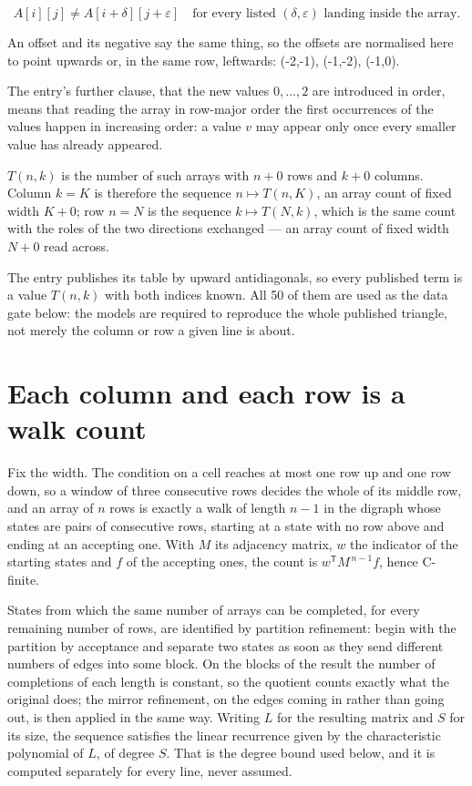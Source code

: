 \documentclass[11pt]{article}
\theoremstyle{definition}
\begin{document}
\[A[i][j] \ne A[i{+}\delta][j{+}\varepsilon]\quad\text{for every listed }(\delta,\varepsilon)\text{ landing inside the array.}\]

An offset and its negative say the same thing, so the offsets are normalised here to point upwards or, in the same row, leftwards: (-2,-1), (-1,-2), (-1,0).

The entry's further clause, that the new values $0,\dots,2$ are introduced in order, means that reading the array in row-major order the first occurrences of the values happen in increasing order: a value $v$ may appear only once every smaller value has already appeared.

$T(n,k)$ is the number of such arrays with $n + 0$ rows and $k + 0$ columns. Column $k = K$ is therefore the sequence $n \mapsto T(n,K)$, an array count of fixed width $K + 0$; row $n = N$ is the sequence $k \mapsto T(N,k)$, which is the same count with the roles of the two directions exchanged --- an array count of fixed width $N + 0$ read across.

The entry publishes its table by upward antidiagonals, so every published term is a value $T(n,k)$ with both indices known. All 50 of them are used as the data gate below: the models are required to reproduce the whole published triangle, not merely the column or row a given line is about.

\section{Each column and each row is a walk count}

Fix the width. The condition on a cell reaches at most one row up and one row down, so a window of three consecutive rows decides the whole of its middle row, and an array of $n$ rows is exactly a walk of length $n-1$ in the digraph whose states are pairs of consecutive rows, starting at a state with no row above and ending at an accepting one. With $M$ its adjacency matrix, $w$ the indicator of the starting states and $f$ of the accepting ones, the count is $w^{\mathsf T}M^{\,n-1}f$, hence C-finite.

States from which the same number of arrays can be completed, for every remaining number of rows, are identified by partition refinement: begin with the partition by acceptance and separate two states as soon as they send different numbers of edges into some block. On the blocks of the result the number of completions of each length is constant, so the quotient counts exactly what the original does; the mirror refinement, on the edges coming in rather than going out, is then applied in the same way. Writing $L$ for the resulting matrix and $S$ for its size, the sequence satisfies the linear recurrence given by the characteristic polynomial of $L$, of degree $S$. That is the degree bound used below, and it is computed separately for every line, never assumed.
\end{document}
